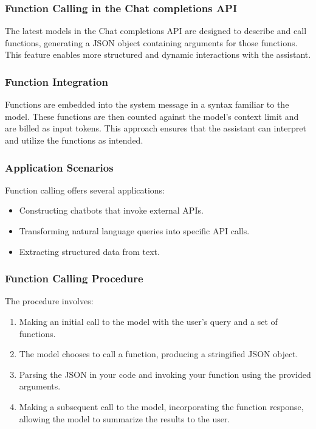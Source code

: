 \documentclass[letterpaper]{article}
\begin{document}
\subsubsection{Function Calling in the Chat completions API}
The latest models in the Chat completions API are designed to describe and call functions, generating a JSON object containing arguments for those functions. This feature enables more structured and dynamic interactions with the assistant.

\subsubsection{Function Integration}
Functions are embedded into the system message in a syntax familiar to the model. These functions are then counted against the model's context limit and are billed as input tokens. This approach ensures that the assistant can interpret and utilize the functions as intended.

\subsubsection{Application Scenarios}
Function calling offers several applications:
\begin{itemize}
    \item Constructing chatbots that invoke external APIs.
    \item Transforming natural language queries into specific API calls.
    \item Extracting structured data from text.
\end{itemize}

\subsubsection{Function Calling Procedure}
The procedure involves:
\begin{enumerate}
    \item Making an initial call to the model with the user's query and a set of functions.
    \item The model chooses to call a function, producing a stringified JSON object.
    \item Parsing the JSON in your code and invoking your function using the provided arguments.
    \item Making a subsequent call to the model, incorporating the function response, allowing the model to summarize the results to the user.
\end{enumerate}
\end{document}
